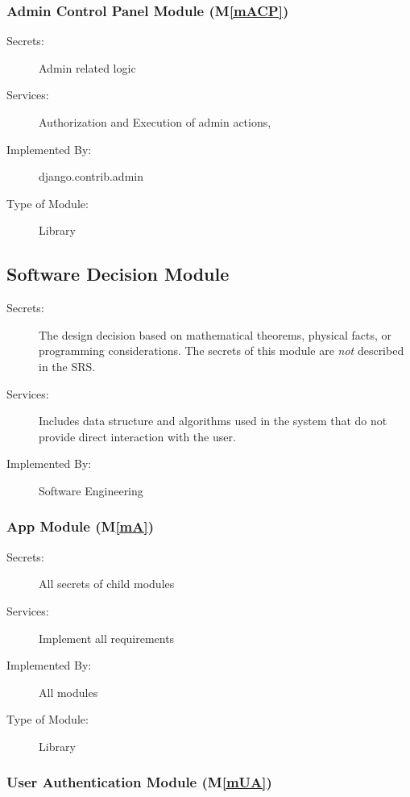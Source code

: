 \documentclass[12pt, titlepage]{article}
\newcommand{\mref}[1]{M\ref{#1}}
\begin{document}
\subsubsection{Admin Control Panel Module (\mref{mACP})}

\begin{description}
\item[Secrets:] Admin related logic
\item[Services:] Authorization and Execution of admin actions, 
\item[Implemented By:] django.contrib.admin
\item[Type of Module:] Library
\end{description}


\subsection{Software Decision Module}

\begin{description}
\item[Secrets:] The design decision based on mathematical theorems, physical
  facts, or programming considerations. The secrets of this module are
  \emph{not} described in the SRS.
\item[Services:] Includes data structure and algorithms used in the system that
  do not provide direct interaction with the user. 
\item[Implemented By:] Software Engineering
\end{description}

\subsubsection{App Module (\mref{mA})}

\begin{description}
\item[Secrets:] All secrets of child modules
\item[Services:] Implement all requirements
\item[Implemented By:] All modules
\item[Type of Module:] Library
\end{description}

\subsubsection{User Authentication Module (\mref{mUA})}
\end{document}
